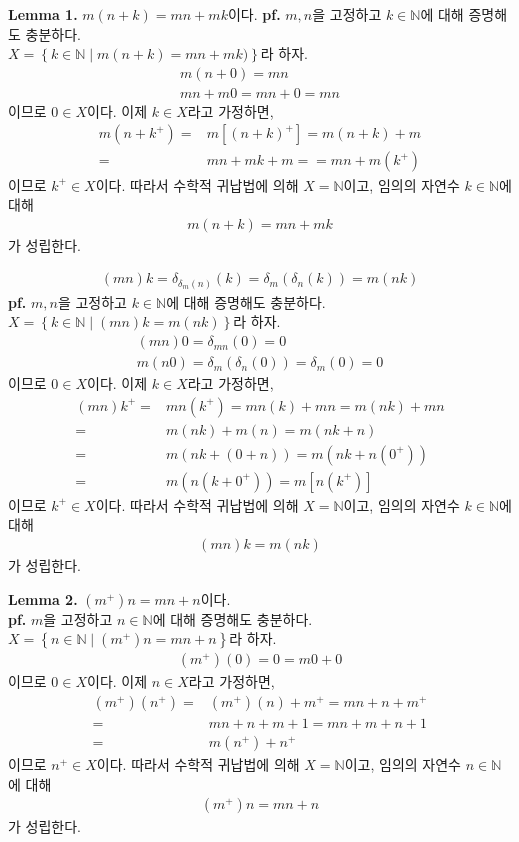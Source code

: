 \documentclass{article}
\begin{document}
\textbf{Lemma 1.} $m(n+k) = mn + mk$이다.
\textbf{pf.} $m, n$을 고정하고 $k \in \mathbb{N}$에 대해 증명해도 충분하다. 
\\$X = \left\{k\in \mathbb{N} \mid m(n+k) = mn+mk) \right\}$라 하자.
\begin{align*}
m(n+0) = mn
\\ mn+m0 = mn+0 = mn
\end{align*}이므로 $0 \in X$이다. 이제 $k \in X$라고 가정하면,
\begin{align*}
m(n+k^+) =& m[(n+k)^+] = m(n+k) + m
\\ =& mn + mk + m = = mn + m(k^+)
\end{align*}이므로 $k^+ \in X$이다. 따라서 수학적 귀납법에 의해 $X = \mathbb{N}$이고, 임의의 자연수 $k \in \mathbb{N}$에 대해
\begin{align*}
m(n+k) = mn+mk
\end{align*}가 성립한다. 

\begin{align*}
(mn)k = \delta_{\delta_{m}(n)}(k) = \delta_{m}(\delta_{n}(k))=m(nk)
\end{align*}
\textbf{pf.} $m, n$을 고정하고 $k \in \mathbb{N}$에 대해 증명해도 충분하다. 
\\$X = \left\{k\in \mathbb{N} \mid (mn)k = m(nk) \right\}$라 하자.
\begin{align*}
(mn)0 = \delta_{mn}(0) = 0
\\ m(n0) = \delta_m(\delta_n(0)) = \delta_m(0) = 0
\end{align*}이므로 $0 \in X$이다. 이제 $k \in X$라고 가정하면,
\begin{align*}
(mn)k^+ =& mn(k^+) = mn(k) + mn = m(nk) + mn 
\\ =& m(nk) + m(n) = m(nk + n) \tag{$\because$ Lemma 1.}
\\ =&  m(nk + (0+n)) = m(nk + n(0^+))  
\\ =& m(n(k+0^+)) = m[n(k^+)]
\end{align*}이므로 $k^+ \in X$이다. 따라서 수학적 귀납법에 의해 $X = \mathbb{N}$이고, 임의의 자연수 $k \in \mathbb{N}$에 대해
\begin{align*}
(mn)k = m(nk)
\end{align*}가 성립한다. 

\textbf{Lemma 2.} $(m^+)n = mn + n$이다.
\\ \textbf{pf.} $m$을 고정하고 $n \in \mathbb{N}$에 대해 증명해도 충분하다. 
\\$X = \left\{n \in \mathbb{N} \mid (m^+)n=mn + n \right\}$라 하자.
\begin{align*}
(m^+)(0) = 0 = m0 + 0
\end{align*}이므로 $0 \in X$이다. 이제 $n \in X$라고 가정하면,
\begin{align*}
(m^+)(n^+) =& (m^+)(n) + m^+ = mn + n + m^+
\\ =& mn + n + m + 1 = mn + m + n + 1
\\ =& m(n^+) + n^+
\end{align*}이므로 $n^+ \in X$이다. 따라서 수학적 귀납법에 의해 $X = \mathbb{N}$이고, 임의의 자연수 $n \in \mathbb{N}$에 대해
\begin{align*}
(m^+)n = mn + n
\end{align*}가 성립한다. 
\end{document}
